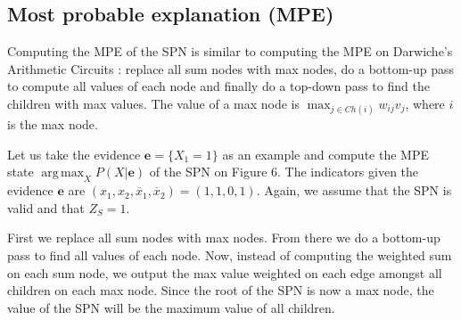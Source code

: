 \documentclass[a4paper,10pt]{article}
\DeclareMathOperator*{\argmax}{arg\,max}
\theoremstyle{plain}
\begin{document}
\begin{figure}[h]
\end{figure}

\subsection{Most probable explanation (MPE)}

Computing the MPE of the SPN is similar to computing the MPE on Darwiche's Arithmetic Circuits
\cite{diff-approach-darwiche}: replace all sum nodes with max nodes, do a bottom-up pass to compute
all values of each node and finally do a top-down pass to find the children with max values. The
value of a max node is $\max_{j\in Ch(i)}w_{ij}v_j$, where $i$ is the max node.

Let us take the evidence $\mathbf{e}=\{X_1=1\}$ as an example and compute the MPE state
$\argmax_X P(X|\mathbf{e})$ of the SPN on Figure 6. The indicators given the evidence $\mathbf{e}$
are $(x_1,x_2,\overline{x}_1,\overline{x}_2)=(1,1,0,1)$. Again, we assume that the SPN is valid and
that $Z_S=1$.

First we replace all sum nodes with max nodes. From there we do a bottom-up pass to find all values
of each node. Now, instead of computing the weighted sum on each sum node, we output the max value
weighted on each edge amongst all children on each max node. Since the root of the SPN is now a max
node, the value of the SPN will be the maximum value of all children.
\end{document}
